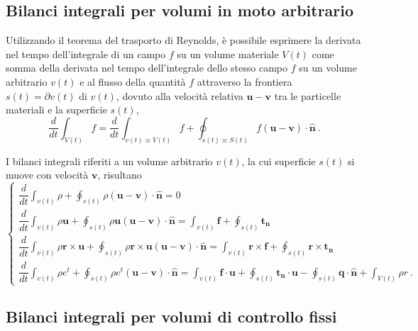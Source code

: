 \subsection{Bilanci integrali per volumi in moto arbitrario}
Utilizzando il teorema del trasporto di Reynolds, è possibile esprimere la derivata nel tempo dell'integrale di un campo $f$ su un volume materiale $V(t)$ come somma della derivata nel tempo dell'integrale dello stesso campo $f$ su un volume arbitrario $v(t)$ e al flusso della quantità $f$ attraverso la frontiera $s(t)=\partial v(t)$ di $v(t)$, dovuto alla velocità relativa $\bm{u} - \bm{v}$ tra le particelle materiali e la superficie $s(t)$,
\begin{equation}
  \dfrac{d}{d t} \int_{V(t)} f = \dfrac{d}{d t} \int_{v(t)\equiv V(t)} f +
 \oint_{s(t)\equiv S(t)} f (\bm{u} - \bm{v}) \cdot \bm{\hat{n}} \ .
\end{equation}

\noindent
I bilanci integrali riferiti a un volume arbitrario $v(t)$, la cui superficie $s(t)$ si muove con velocità $\bm{v}$, risultano
\begin{equation}
\begin{cases}
 \dfrac{d}{dt} \displaystyle\int_{v(t)} \rho + \oint_{s(t)} \rho (\bm{u}-\bm{v}) \cdot \bm{\hat{n}}= 0  \\
 \dfrac{d}{dt} \displaystyle\int_{v(t)} \rho \bm{u} + \oint_{s(t)} \rho \bm{u} (\bm{u} - \bm{v}) \cdot \bm{\hat{n}} = \int_{v(t)} \bm{f} + \oint_{s(t)} \bm{t_n}  \\
 \dfrac{d}{dt} \displaystyle\int_{v(t)} \rho \bm{r} \times \bm{u} + \oint_{s(t)} \rho \bm{r} \times \bm{u} (\bm{u}-\bm{v}) \cdot \bm{\hat{n}}= \int_{v(t)} \bm{r} \times \bm{f} + \oint_{s(t)} \bm{r} \times \bm{t_n} \\
 \dfrac{d}{dt} \displaystyle\int_{v(t)} \rho e^t + \oint_{s(t)} \rho e^t (\bm{u}-\bm{v}) \cdot \bm{\hat{n}}= \int_{v(t)} \bm{f} \cdot \bm{u} + \oint_{s(t)} \bm{t_n} \cdot \bm{u} - \oint_{s(t)} \bm{q} \cdot \bm{\hat{n}} + \int_{V(t)} \rho r \ .
\end{cases}
\end{equation}

\subsection{Bilanci integrali per volumi di controllo fissi}

